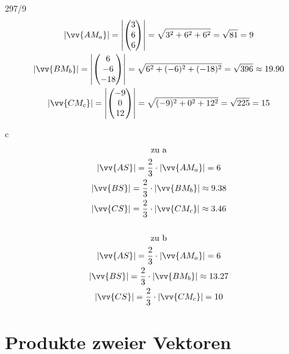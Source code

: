 \begin{exercise}{297/9}
\begin{gather*}
    |\vv{AM_a}| = \left|\begin{pmatrix}3 \\ 6 \\ 6\end{pmatrix}\right| = \sqrt{3^2 + 6^2 + 6^2} = \sqrt{81} = 9 \\
    |\vv{BM_b}| = \left|\begin{pmatrix}6 \\ -6 \\ -18\end{pmatrix}\right| = \sqrt{6^2 + (-6)^2 + (-18)^2} = \sqrt{396} \approx 19.90 \\
    |\vv{CM_c}| = \left|\begin{pmatrix}-9 \\ 0 \\ 12\end{pmatrix}\right| = \sqrt{(-9)^2 + 0^2 + 12^2} = \sqrt{225} = 15
  \end{gather*}
  \item [c]
  \begin{gather*}
    \text{zu a} \\
    |\vv{AS}| = \frac{2}{3} \cdot |\vv{AM_a}| = 6 \\
    |\vv{BS}| = \frac{2}{3} \cdot |\vv{BM_b}| \approx 9.38 \\
    |\vv{CS}| = \frac{2}{3} \cdot |\vv{CM_c}| \approx 3.46 \\\\
    \text{zu b} \\
    |\vv{AS}| = \frac{2}{3} \cdot |\vv{AM_a}| = 6 \\
    |\vv{BS}| = \frac{2}{3} \cdot |\vv{BM_b}| \approx 13.27 \\
    |\vv{CS}| = \frac{2}{3} \cdot |\vv{CM_c}| = 10
  \end{gather*}
\end{exercise}
\section{Produkte zweier Vektoren}
